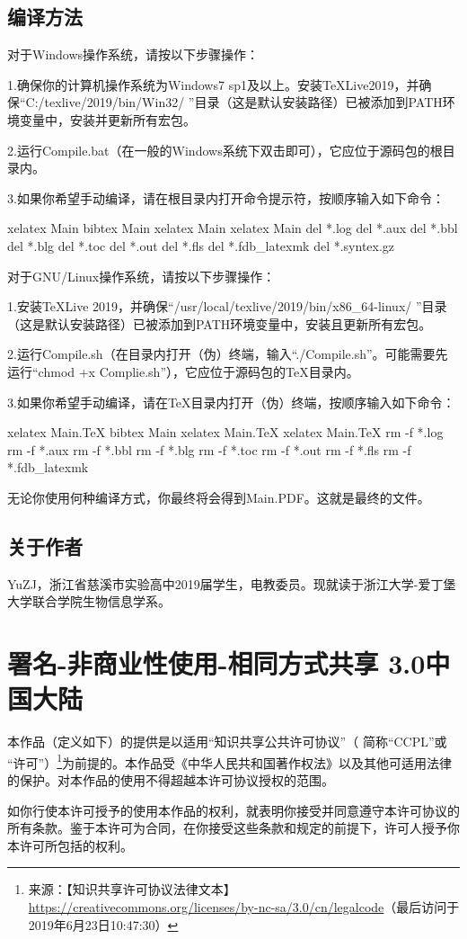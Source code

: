 \subsection{编译方法}
对于Windows操作系统，请按以下步骤操作：\par
1.确保你的计算机操作系统为Windows7 sp1及以上。安装TeXLive2019，并确保“C:/texlive/2019/bin/Win32/ ”目录（这是默认安装路径）已被添加到PATH环境变量中，安装并更新所有宏包。\par
2.运行Compile.bat（在一般的Windows系统下双击即可），它应位于源码包的根目录内。\par
3.如果你希望手动编译，请在根目录内打开命令提示符，按顺序输入如下命令：
\begin{verbatim*}
xelatex Main
bibtex Main
xelatex Main
xelatex Main
del *.log
del *.aux
del *.bbl
del *.blg
del *.toc
del *.out
del *.fls
del *.fdb_latexmk
del *.syntex.gz
\end{verbatim*}
对于GNU/Linux操作系统，请按以下步骤操作：\par
1.安装TeXLive 2019，并确保“/usr/local/texlive/2019/bin/x86\_64-linux/ ”目录（这是默认安装路径）已被添加到PATH环境变量中，安装且更新所有宏包。\par
2.运行Compile.sh（在目录内打开（伪）终端，输入“./Compile.sh”。可能需要先运行“chmod +x Complie.sh”），它应位于源码包的TeX目录内。\par
3.如果你希望手动编译，请在TeX目录内打开（伪）终端，按顺序输入如下命令：
\begin{verbatim*}
xelatex Main.TeX
bibtex Main
xelatex Main.TeX
xelatex Main.TeX
rm -f *.log
rm -f *.aux
rm -f *.bbl
rm -f *.blg
rm -f *.toc
rm -f *.out
rm -f *.fls
rm -f *.fdb_latexmk
\end{verbatim*}
无论你使用何种编译方式，你最终将会得到Main.PDF。这就是最终的文件。
\subsection{关于作者}
YuZJ，浙江省慈溪市实验高中2019届学生，电教委员。现就读于浙江大学-爱丁堡大学联合学院生物信息学系。
\section{署名-非商业性使用-相同方式共享 3.0中国大陆}
本作品（定义如下）的提供是以适用“知识共享公共许可协议”（ 简称“CCPL”或 “许可”）\footnote{来源：【知识共享许可协议法律文本】\url{https://creativecommons.org/licenses/by-nc-sa/3.0/cn/legalcode}（最后访问于2019年6月23日10:47:30）}为前提的。本作品受《中华人民共和国著作权法》以及其他可适用法律的保护。对本作品的使用不得超越本许可协议授权的范围。\par
如你行使本许可授予的使用本作品的权利，就表明你接受并同意遵守本许可协议的所有条款。鉴于本许可为合同，在你接受这些条款和规定的前提下，许可人授予你本许可所包括的权利。
